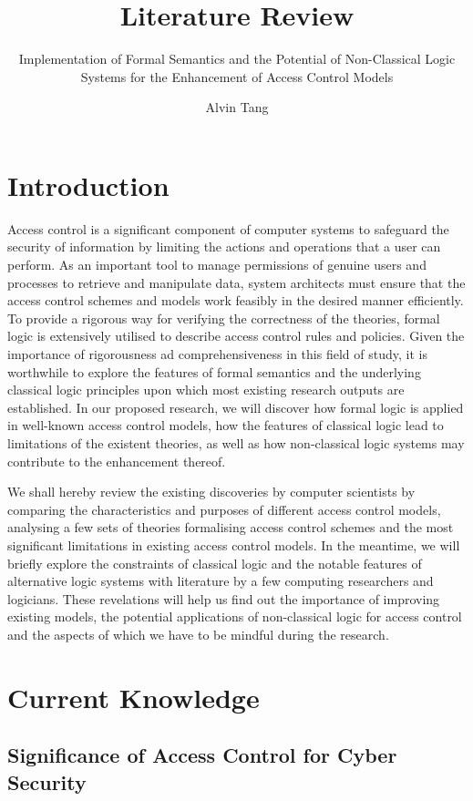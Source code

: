 \documentclass{article}
\title{Literature Review}
\subtitle{Implementation of Formal Semantics and the Potential of Non-Classical
Logic Systems for the Enhancement of Access Control Models}
\author{Alvin Tang}
\date{}
\begin{document}
\maketitle

\section{Introduction}

Access control is a significant component of computer systems to safeguard
the security of information by limiting the actions and operations that
a user can perform. As an important tool to manage permissions of genuine
users and processes to retrieve and manipulate data\cite{principles}, system
architects must ensure that the access control schemes and models work feasibly
in the desired manner efficiently. To provide a rigorous way for verifying the
correctness of the theories, formal logic is extensively utilised to describe
access control rules and policies. Given the importance of rigorousness ad
comprehensiveness in this field of study, it is worthwhile to explore the
features of formal semantics and the underlying classical logic principles
upon which most existing research outputs are established. In our proposed
research, we will discover how formal logic is applied in well-known access
control models, how the features of classical logic lead to limitations
of the existent theories, as well as how non-classical logic systems may
contribute to the enhancement thereof.

We shall hereby review the existing discoveries by computer scientists
by comparing the characteristics and purposes of different access control
models, analysing a few sets of theories formalising access control schemes
and the most significant limitations in existing access control models. In
the meantime, we will briefly explore the constraints of classical logic
and the notable features of alternative logic systems with literature by a
few computing researchers and logicians. These revelations will help us find
out the importance of improving existing models, the potential applications
of non-classical logic for access control and the aspects of which we have
to be mindful during the research.

\section{Current Knowledge}

\subsection{Significance of Access Control for Cyber Security}
\end{document}
